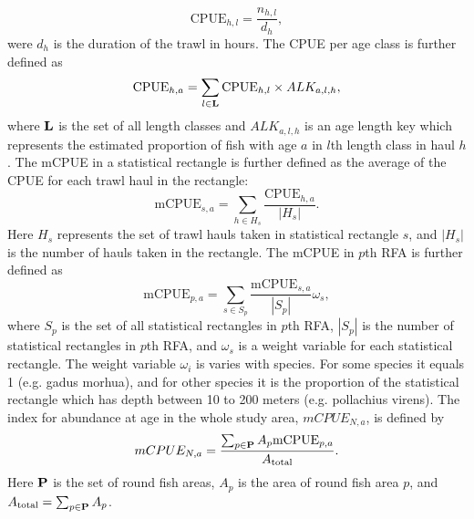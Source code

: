 \documentclass[a4paper 12pt]{article}
\numberwithin{equation}{section}
\begin{document}
\begin{equation}\label{eq:cpueHaul}
\mathrm{CPUE}_{h,l} =\frac{n_{h,l}}{d_h},
\end{equation}
were $d_h$ is the duration of the trawl in hours. The CPUE per age class is further defined as
\begin{equation}\label{eq:cpueALK}
\mathrm{CPUE}_{h,a} =\sum_{l \in {\bf L}}\mathrm{CPUE}_{h, l} \times ALK_{a,l,h},
\end{equation}
where ${\bf L}$ is the set of all length classes and $ALK_{a,l,h}$ is an age length key which represents the estimated proportion of fish with age $a$ in $l$th length class in haul $h$. The mCPUE in a statistical rectangle is further defined as the average of the CPUE for each trawl haul in the rectangle:
\begin{equation}\label{eq:cpueRec}
\mathrm{mCPUE}_{s,a} =\sum_{h \in H_{s}}\frac{\mathrm{CPUE}_{h,a}}{|H_{s}|}.
\end{equation}
Here $H_{s}$ represents the set of trawl hauls taken in statistical rectangle $s$, and $|H_{s}|$ is the number of hauls taken in the rectangle. The mCPUE in $p$th RFA is further defined as
\begin{equation}\label{eq:cpueRFA}
\mathrm{mCPUE}_{p,a} = \sum_{s \in S_{p}} \frac{\mathrm{mCPUE}_{s,a}}{|S_{p}|} \omega_s,
\end{equation}
where $S_{p}$ is the set of all statistical rectangles in $p$th RFA, $|S_{p}|$ is the number of statistical rectangles in $p$th RFA, and $\omega_s$ is a weight variable for each statistical rectangle. The weight variable $\omega_i$ is varies with species. For some species it equals 1 (e.g. gadus morhua), and for other species it is the proportion of the statistical rectangle which has depth between 10 to 200 meters (e.g. pollachius virens).  The index for abundance at age in the whole study area, $mCPUE_{N,a} $, is defined by
\begin{equation}
mCPUE_{N,a} = \frac{\sum_{p\in {\bf P}} A_{p}  \mathrm{mCPUE}_{p,a}}{A_{\text{total}}}.
\label{abundanceestimatornorthsea}
\end{equation}
Here ${\bf P}$ is the set of round fish areas, $A_p$ is the area of round fish area $p$, and $A_{\text{total}} = \sum_{p\in {\bf P}} A_{p}$.

 
\end{document}
